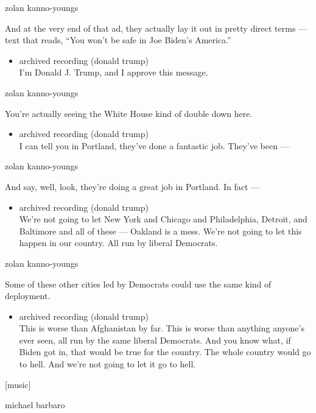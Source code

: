 zolan kanno-youngs

And at the very end of that ad, they actually lay it out in pretty
direct terms --- text that reads, ``You won't be safe in Joe Biden's
America.''

\begin{itemize}
\tightlist
\item
  archived recording (donald trump)\\
  I'm Donald J. Trump, and I approve this message.
\end{itemize}

zolan kanno-youngs

You're actually seeing the White House kind of double down here.

\begin{itemize}
\tightlist
\item
  archived recording (donald trump)\\
  I can tell you in Portland, they've done a fantastic job. They've been
  ---
\end{itemize}

zolan kanno-youngs

And say, well, look, they're doing a great job in Portland. In fact ---

\begin{itemize}
\tightlist
\item
  archived recording (donald trump)\\
  We're not going to let New York and Chicago and Philadelphia, Detroit,
  and Baltimore and all of these --- Oakland is a mess. We're not going
  to let this happen in our country. All run by liberal Democrats.
\end{itemize}

zolan kanno-youngs

Some of these other cities led by Democrats could use the same kind of
deployment.

\begin{itemize}
\tightlist
\item
  archived recording (donald trump)\\
  This is worse than Afghanistan by far. This is worse than anything
  anyone's ever seen, all run by the same liberal Democrats. And you
  know what, if Biden got in, that would be true for the country. The
  whole country would go to hell. And we're not going to let it go to
  hell.
\end{itemize}

{[}music{]}

michael barbaro

